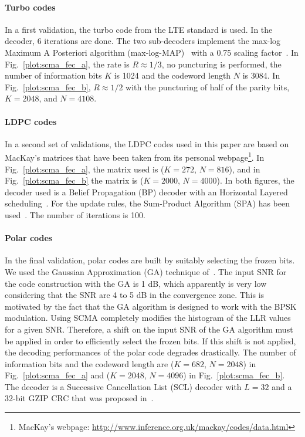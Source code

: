 \paragraph{Turbo codes}

In a first validation, the turbo code from the LTE standard is used. In the
decoder, 6 iterations are done. The two sub-decoders implement the max-log
Maximum A Posteriori algorithm (max-log-MAP)~\cite{Robertson1995} with a 0.75
scaling factor~\cite{Vogt2000}. In Fig.~\ref{plot:scma_fec_a}, the rate is
$R \approx 1/3$, no puncturing is performed, the number of information bits
$K$ is 1024 and the codeword length $N$ is 3084. In Fig.~\ref{plot:scma_fec_b},
$R \approx 1/2$ with the puncturing of half of the parity bits,
$K=2048$, and $N=4108$.

\paragraph{LDPC codes}

In a second set of validations, the LDPC codes used in this paper are based on
MacKay's matrices that have been taken from its personal
webpage\footnote{MacKay's webpage: \url{http://www.inference.org.uk/mackay/codes/data.html}}.
In Fig.~\ref{plot:scma_fec_a}, the matrix used is ($K=272$, $N=816$), and in
Fig.~\ref{plot:scma_fec_b} the matrix is ($K=2000$, $N=4000$). In both figures,
the decoder used is a Belief Propagation (BP) decoder with an Horizontal Layered
scheduling~\cite{Yeo2001}. For the update rules, the Sum-Product Algorithm (SPA)
has been used~\cite{MacKay1999}. The number of iterations is 100.

\paragraph{Polar codes}

In the final validation, polar codes are built by suitably selecting the frozen
bits. We used the Gaussian Approximation (GA) technique of~\cite{Trifonov2012}.
The input SNR for the code construction with the GA is 1 dB, which apparently is
very low considering that the SNR are 4 to 5 dB in the convergence zone. This is
motivated by the fact that the GA algorithm is designed to work with the BPSK
modulation. Using SCMA completely modifies the histogram of the LLR values for a
given SNR. Therefore, a shift on the input SNR of the GA algorithm must be
applied in order to efficiently select the frozen bits. If this shift is
not applied, the decoding performances of the polar code degrades drastically.
The number of information bits and the codeword length are ($K=682$, $N=2048$)
in Fig.~\ref{plot:scma_fec_a} and ($K=2048$, $N=4096$) in
Fig.~\ref{plot:scma_fec_b}. The decoder is a Successive Cancellation List (SCL)
decoder with $L=32$ and a 32-bit GZIP CRC that was proposed
in~\cite{Leonardon2019}.

